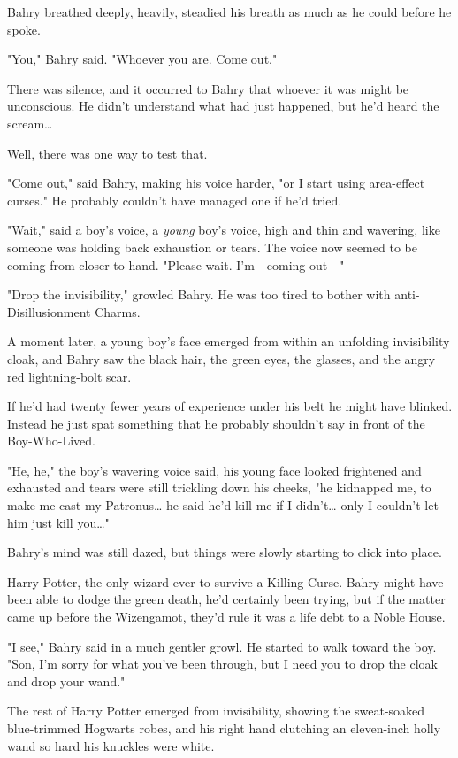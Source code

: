 Bahry breathed deeply, heavily, steadied his breath as much as he could before
he spoke.

"You," Bahry said. "Whoever you are. Come out."

There was silence, and it occurred to Bahry that whoever it was might be
unconscious. He didn't understand what had just happened, but he'd heard the
scream{\ldots}

Well, there was one way to test that.

"Come out," said Bahry, making his voice harder, "or I start using area-effect
curses." He probably couldn't have managed one if he'd tried.

"Wait," said a boy's voice, a \emph{young} boy's voice, high and thin and
wavering, like someone was holding back exhaustion or tears. The voice now
seemed to be coming from closer to hand. "Please wait. I'm---coming out---"

"Drop the invisibility," growled Bahry. He was too tired to bother with
anti-Disillusionment Charms.

A moment later, a young boy's face emerged from within an unfolding
invisibility cloak, and Bahry saw the black hair, the green eyes, the glasses,
and the angry red lightning-bolt scar.

If he'd had twenty fewer years of experience under his belt he might have
blinked. Instead he just spat something that he probably shouldn't say
in front of the Boy-Who-Lived.

"He, he," the boy's wavering voice said, his young face looked frightened and
exhausted and tears were still trickling down his cheeks, "he kidnapped me, to
make me cast my Patronus{\ldots} he said he'd kill me if I didn't{\ldots} only
I couldn't let him just kill you{\ldots}"

Bahry's mind was still dazed, but things were slowly starting to click into
place.

Harry Potter, the only wizard ever to survive a Killing Curse. Bahry might have
been able to dodge the green death, he'd certainly been trying, but if the
matter came up before the Wizengamot, they'd rule it was a life debt to a Noble
House.

"I see," Bahry said in a much gentler growl. He started to walk toward the boy.
"Son, I'm sorry for what you've been through, but I need you to drop the cloak
and drop your wand."

The rest of Harry Potter emerged from invisibility, showing the sweat-soaked
blue-trimmed Hogwarts robes, and his right hand clutching an eleven-inch holly
wand so hard his knuckles were white.


